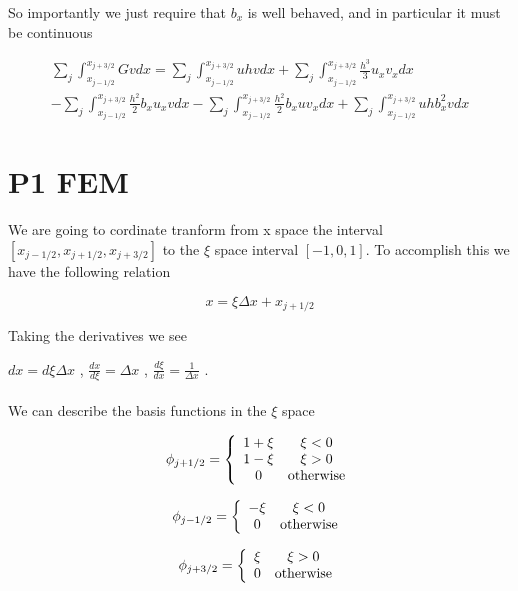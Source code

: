 \documentclass[12pt]{article}
\begin{document}
So importantly we just require that $b_x$ is well behaved, and in particular it must be continuous


\begin{multline*}
\sum_{j}\int_{x_{j-1/2}}^{x_{j+3/2}} Gv dx = \sum_{j}\int_{x_{j-1/2}}^{x_{j+3/2}}  uhv dx + \sum_{j}\int_{x_{j-1/2}}^{x_{j+3/2}} \frac{h^3}{3}u_{x}v_{x}dx \\- \sum_{j}\int_{x_{j-1/2}}^{x_{j+3/2}} \frac{h^2}{2}b_x u_x vdx -\sum_{j}\int_{x_{j-1/2}}^{x_{j+3/2}}  \frac{h^2}{2}b_x u v_x dx + \sum_{j}\int_{x_{j-1/2}}^{x_{j+3/2}} u h b_x^2 vdx 
\end{multline*}

\section{P1 FEM}
We are going to cordinate tranform from x space the interval $[x_{j-1/2},x_{j+1/2} ,x_{j+3/2}]$ to the $\xi$ space interval $[-1,0,1]$. To accomplish this we have the following relation

$$x = \xi\Delta x + x_{j+1/2}$$

Taking the derivatives we see


$dx = d\xi\Delta x$ , $\frac{dx}{d\xi} = \Delta x$ , $\frac{d\xi}{dx} = \frac{1}{\Delta x}$ . \\ \\ We can describe the basis functions in the $\xi$ space

\begin{equation}
\phi_{j+1/2} = \left\lbrace \begin{array}{c c}
1 + \xi & \xi < 0 \\
1 - \xi & \xi > 0\\
0 & \text{otherwise}
\end{array} 
\right.
\end{equation}

\begin{equation}
\phi_{j-1/2} = \left\lbrace \begin{array}{c c}
-\xi & \xi < 0 \\
0 & \text{otherwise}
\end{array} 
\right.
\end{equation}

\begin{equation}
\phi_{j+3/2} = \left\lbrace \begin{array}{c c}
\xi & \xi > 0 \\
0 & \text{otherwise}
\end{array} 
\right.
\end{equation}
\end{document}
